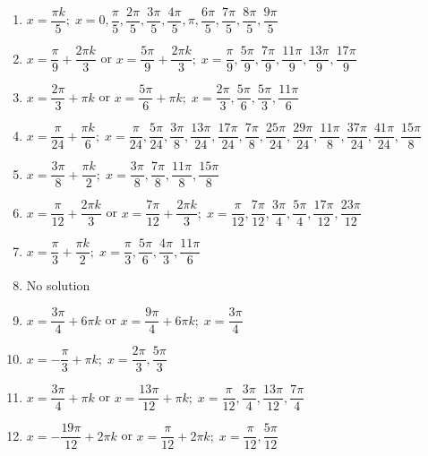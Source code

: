 \begin{enumerate}

\item $x = \dfrac{\pi k}{5}; \; x = 0, \dfrac{\pi}{5}, \dfrac{2\pi}{5}, \dfrac{3\pi}{5}, \dfrac{4\pi}{5}, \pi, \dfrac{6\pi}{5}, \dfrac{7\pi}{5}, \dfrac{8\pi}{5}, \dfrac{9\pi}{5}$

\item $x = \dfrac{\pi}{9} + \dfrac{2\pi k}{3}$ or $x = \dfrac{5\pi}{9} + \dfrac{2\pi k}{3}; \; x = \dfrac{\pi}{9}, \dfrac{5\pi}{9}, \dfrac{7\pi}{9}, \dfrac{11\pi}{9}, \dfrac{13\pi}{9}, \dfrac{17\pi}{9}$

\item $x = \dfrac{2\pi}{3} + \pi k$ or $x = \dfrac{5\pi}{6} + \pi k; \; x = \dfrac{2\pi}{3}, \dfrac{5\pi}{6}, \dfrac{5\pi}{3}, \dfrac{11\pi}{6}$

\item $x = \dfrac{\pi}{24} + \dfrac{\pi k}{6}; \; x = \dfrac{\pi}{24}, \dfrac{5\pi}{24}, \dfrac{3\pi}{8}, \dfrac{13\pi}{24}, \dfrac{17\pi}{24}, \dfrac{7\pi}{8}, \dfrac{25\pi}{24}, \dfrac{29\pi}{24}, \dfrac{11\pi}{8}, \dfrac{37\pi}{24}, \dfrac{41\pi}{24}, \dfrac{15\pi}{8}$

\item $x = \dfrac{3\pi}{8} + \dfrac{\pi k}{2}; \; x = \dfrac{3\pi}{8}, \dfrac{7\pi}{8}, \dfrac{11\pi}{8}, \dfrac{15\pi}{8}$

\item $x = \dfrac{\pi}{12} + \dfrac{2\pi k}{3}$ or $x = \dfrac{7\pi}{12} + \dfrac{2\pi k}{3}; \; x = \dfrac{\pi}{12}, \dfrac{7\pi}{12}, \dfrac{3\pi}{4}, \dfrac{5\pi}{4}, \dfrac{17\pi}{12}, \dfrac{23\pi}{12}$

\item $x = \dfrac{\pi}{3} + \dfrac{\pi k}{2}; \; x = \dfrac{\pi}{3}, \dfrac{5\pi}{6}, \dfrac{4\pi}{3}, \dfrac{11\pi}{6}$

\item No solution

\item $x = \dfrac{3\pi}{4} + 6\pi k$ or $x = \dfrac{9\pi}{4} + 6\pi k; \; x = \dfrac{3\pi}{4}$

\item $x = -\dfrac{\pi}{3} + \pi k; \; x = \dfrac{2\pi}{3}, \dfrac{5\pi}{3}$

\item $x = \dfrac{3\pi}{4} + \pi k$ or $x = \dfrac{13\pi}{12} + \pi k; \; x = \dfrac{\pi}{12}, \dfrac{3\pi}{4}, \dfrac{13\pi}{12}, \dfrac{7\pi}{4}$

\item $x = -\dfrac{19\pi}{12} + 2\pi k$ or $x = \dfrac{\pi}{12} + 2\pi k; \; x = \dfrac{\pi}{12}, \dfrac{5\pi}{12}$


\end{enumerate}
